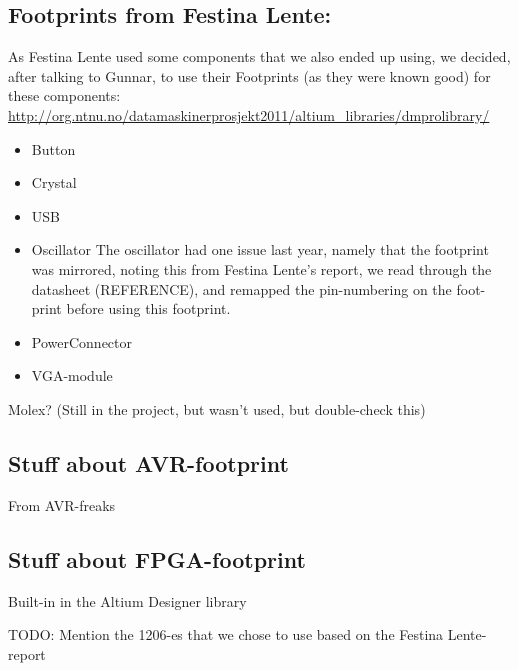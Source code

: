 \subsection {Footprints from Festina Lente:}
As Festina Lente used some components that we also ended up using, we decided,
after talking to Gunnar, to use their Footprints (as they were known good) for these
components:
\url{http://org.ntnu.no/datamaskinerprosjekt2011/altium_libraries/dmprolibrary/}
\begin {itemize}
\item Button
\item Crystal
\item USB
\item Oscillator
The oscillator had one issue last year, namely that the footprint was mirrored,
noting this from Festina Lente's report, we read through the datasheet (REFERENCE),
and remapped the pin-numbering on the foot-print before using this footprint.
\item PowerConnector
\item VGA-module
\end {itemize}
Molex? (Still in the project, but wasn't used, but double-check this)

\subsection {Stuff about AVR-footprint}
From AVR-freaks
\subsection {Stuff about FPGA-footprint}
Built-in in the Altium Designer library

TODO: Mention the 1206-es that we chose to use based on the Festina Lente-report
